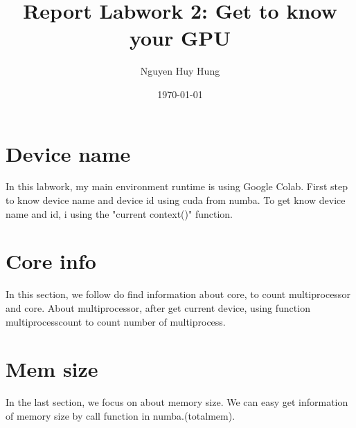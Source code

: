 \documentclass{article} \title{Report Labwork 2: Get to know your GPU}
\author{Nguyen Huy Hung}
\date{\today}
\begin{document}
 
\maketitle 
\section{Device name} 
In this labwork, my main environment runtime is using Google Colab.
First step to know device name and device id using cuda from numba. To get know device name and id, i using the "current context()" function.

\section{Core info}
In this section, we follow do find information about core, to count multiprocessor and core.
About multiprocessor, after get current device, using function multiprocesscount to count number of multiprocess.

\section{Mem size}
In the last section, we focus on about memory size. We can easy get information of memory size by call function in numba.(totalmem).
\end{document}
